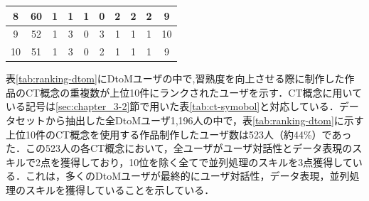 \documentclass[submit,ses,noauthor]{ipsj}
\begin{document}
\begin{table}[]
\begin{tabular}{c|c|cccccccc}
8                   & 60                   & \multicolumn{1}{c|}{1} & \multicolumn{1}{c|}{1} & \multicolumn{1}{c|}{1} & \multicolumn{1}{c|}{0} & \multicolumn{1}{c|}{2} & \multicolumn{1}{c|}{2} & \multicolumn{1}{c|}{2} & 9  \\ \hline
9                   & 52                   & \multicolumn{1}{c|}{1} & \multicolumn{1}{c|}{3} & \multicolumn{1}{c|}{0} & \multicolumn{1}{c|}{3} & \multicolumn{1}{c|}{1} & \multicolumn{1}{c|}{1} & \multicolumn{1}{c|}{1} & 10 \\ \hline
10                  & 51                   & \multicolumn{1}{c|}{1} & \multicolumn{1}{c|}{3} & \multicolumn{1}{c|}{0} & \multicolumn{1}{c|}{2} & \multicolumn{1}{c|}{1} & \multicolumn{1}{c|}{1} & \multicolumn{1}{c|}{1} & 9 \\ \hline
\end{tabular}
\end{table}

表\ref{tab:ranking-dtom}にDtoMユーザの中で,習熟度を向上させる際に制作した作品のCT概念の重複数が上位10件にランクされたユーザを示す．CT概念に用いている記号は\ref{sec:chapter_3-2}節で用いた表\ref{tab:ct-symobol}と対応している．データセットから抽出した全DtoMユーザ1,196人の中で，表\ref{tab:ranking-dtom}に示す上位10件のCT概念を使用する作品制作したユーザ数は523人（約44\%）であった．この523人の各CT概念において，全ユーザがユーザ対話性とデータ表現のスキルで2点を獲得しており，10位を除く全てで並列処理のスキルを3点獲得している．これは，多くのDtoMユーザが最終的にユーザ対話性，データ表現，並列処理のスキルを獲得していることを示している．
\end{document}
